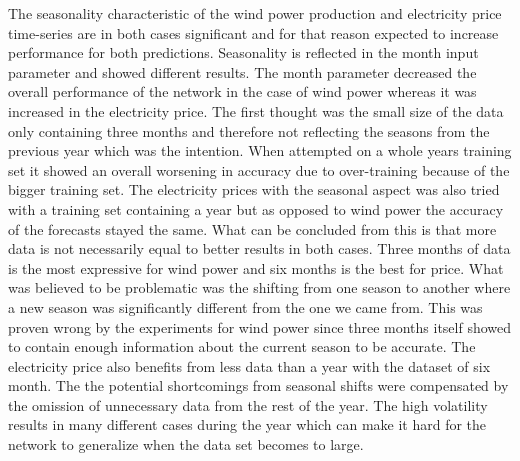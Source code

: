 The seasonality characteristic of the wind power production and electricity price time-series are in both cases significant and for that reason expected to increase performance for both predictions. Seasonality is reflected in the month input parameter and showed different results. The month parameter decreased the overall performance of the network in the case of wind power whereas it was increased in the electricity price. The first thought was the small size of the data only containing three months and therefore not reflecting the seasons from the previous year which was the intention. When attempted on a whole years training set it showed an overall worsening in accuracy due to over-training because of the bigger training set. The electricity prices with the seasonal aspect was also tried with a training set containing a year but as opposed to wind power the accuracy of the forecasts stayed the same. What can be concluded from this is that more data is not necessarily equal to better results in both cases. Three months of data is the most expressive for wind power and six months is the best for price. What was believed to be problematic was the shifting from one season to another where a new season was significantly different from the one we came from. This was proven wrong by the experiments for wind power since three months itself showed to contain enough information about the current season to be accurate. The electricity price also benefits from less data than a year with the dataset of six month. The the potential shortcomings from seasonal shifts were compensated by the omission of unnecessary data from the rest of the year. The high volatility results in many different cases during the year which can make it hard for the network to generalize when the data set becomes to large.

